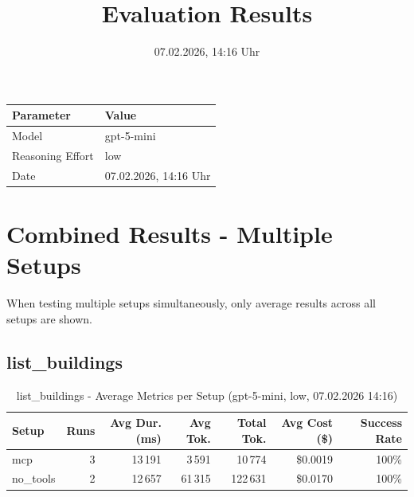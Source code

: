 \documentclass[a4paper,11pt]{article}
\title{Evaluation Results}
\date{07.02.2026, 14:16 Uhr}
\begin{document}
\maketitle

\begin{table}[H]
\centering
\begin{tabular}{l l}
\toprule
\textbf{Parameter} & \textbf{Value} \\
\midrule
Model & gpt-5-mini \\
Reasoning Effort & low \\
Date & 07.02.2026, 14:16 Uhr \\
\bottomrule
\end{tabular}
\end{table}

\tableofcontents
\clearpage

\section{Combined Results - Multiple Setups}

When testing multiple setups simultaneously, only average results across all setups are shown.

\subsection{list\_buildings}

\begin{table}[H]
\centering
\scriptsize
\caption{list\_buildings - Average Metrics per Setup (gpt-5-mini, low, 07.02.2026 14:16)}
\label{tab:combined\_list\_buildings\_metrics\_20260207}
\begin{tabular}{l r r r r r r}
\toprule
Setup & Runs & Avg Dur. (ms) & Avg Tok. & Total Tok. & Avg Cost (\$) & Success Rate \\
\midrule
mcp & 3 & 13\,191 & 3\,591 & 10\,774 & \$0.0019 & 100\% \\
no\_tools & 2 & 12\,657 & 61\,315 & 122\,631 & \$0.0170 & 100\% \\
\bottomrule
\end{tabular}
\end{table}
\end{document}
